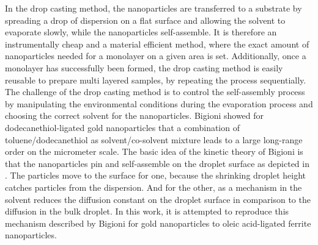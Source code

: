\documentclass[\main/dresen_thesis.tex]{subfiles}
\begin{document}
  In the drop casting method, the nanoparticles are transferred to a substrate by spreading a drop of dispersion on a flat surface and allowing the solvent to evaporate slowly, while the nanoparticles self-assemble.
  It is therefore an instrumentally cheap and a material efficient method, where the exact amount of nanoparticles needed for a monolayer on a given area is set.
  Additionally, once a monolayer has successfully been formed, the drop casting method is easily reusable to prepare multi layered samples, by repeating the process sequentially.
  The challenge of the drop casting method is to control the self-assembly process by manipulating the environmental conditions during the evaporation process and choosing the correct solvent for the nanoparticles.
  Bigioni \etal \cite{Bigioni_2006_Kinet} showed for dodecanethiol-ligated gold nanoparticles that a combination of toluene/dodecanethiol as solvent/co-solvent mixture leads to a large long-range order on the micrometer scale.
  The basic idea of the kinetic theory of Bigioni \etal is that the nanoparticles pin and self-assemble on the droplet surface as depicted in .
  The particles move to the surface for one, because the shrinking droplet height catches particles from the dispersion.
  And for the other, as a mechanism in the solvent reduces the diffusion constant on the droplet surface in comparison to the diffusion in the bulk droplet.
  In this work, it is attempted to reproduce this mechanism described by Bigioni for gold nanoparticles to oleic acid-ligated ferrite nanoparticles.
\end{document}
